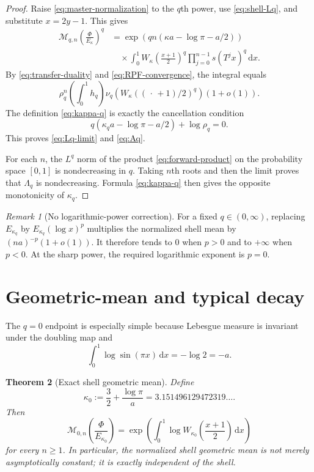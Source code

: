 \documentclass[11pt,oneside]{article}
\newtheorem{theorem}{Theorem}[section]
\theoremstyle{definition}
\theoremstyle{remark}
\newtheorem{remark}[theorem]{Remark}
\newcommand{\dd}{\,\mathrm d}
\newcommand{\Phiup}{\Phi}
\begin{document}
\begin{proof}
Raise \eqref{eq:master-normalization} to the $q$th power, use
\eqref{eq:shell-Lq}, and substitute $x=2y-1$.  This gives
\begin{align*}
 \mathcal M_{q,n}\!\left(\frac{\Phiup}{E_\kappa}\right)^q
 &=\exp\!\left(qn(\kappa a-\log\pi-a/2)\right)\\
 &\quad\times\int_0^1
 W_\kappa\!\left(\frac{x+1}{2}\right)^q
 \prod_{j=0}^{n-1}s(T^jx)^q\dd x.
\end{align*}
By \eqref{eq:transfer-duality} and \eqref{eq:RPF-convergence}, the integral equals
\[
 \rho_q^n\left(\int_0^1h_q\right)
 \nu_q\!\left(W_\kappa((\,\cdot\,+1)/2)^q\right)(1+o(1)).
\]
The definition \eqref{eq:kappa-q} is exactly the cancellation condition
\[
 q(\kappa_q a-\log\pi-a/2)+\log\rho_q=0.
\]
This proves \eqref{eq:Lq-limit} and \eqref{eq:Aq}.

For each $n$, the $L^q$ norm of the product \eqref{eq:forward-product} on the probability
space $[0,1]$ is nondecreasing in $q$.  Taking $n$th roots and then the limit proves that
$\Lambda_q$ is nondecreasing.  Formula \eqref{eq:kappa-q} then gives the opposite
monotonicity of $\kappa_q$.
\end{proof}

\begin{remark}[No logarithmic-power correction]
\label{rem:no-log-correction}
For a fixed $q\in(0,\infty)$, replacing $E_{\kappa_q}$ by
$E_{\kappa_q}(\log x)^p$ multiplies the normalized shell mean by
$(na)^{-p}(1+o(1))$.  It therefore tends to $0$ when $p>0$ and to $+\infty$ when $p<0$.
At the sharp power, the required logarithmic exponent is $p=0$.
\end{remark}

\section{Geometric-mean and typical decay}
\label{sec:typical}

The $q=0$ endpoint is especially simple because Lebesgue measure is invariant under the
doubling map and
\begin{equation}
 \int_0^1\log\sin(\pi x)\dd x=-\log2=-a.
 \label{eq:log-sine-integral}
\end{equation}

\begin{theorem}[Exact shell geometric mean]
\label{thm:geometric-mean}
Define
\begin{equation}
 \kappa_0:=\frac32+\frac{\log\pi}{a}
 =3.151496129472319\ldots .
 \label{eq:kappa0}
\end{equation}
Then
\begin{equation}
 \mathcal M_{0,n}\!\left(\frac{\Phiup}{E_{\kappa_0}}\right)
 =\exp\!\left(\int_0^1
    \log W_{\kappa_0}\!\left(\frac{x+1}{2}\right)\dd x\right)
 \label{eq:exact-geometric-mean}
\end{equation}
for every $n\ge1$.  In particular, the normalized shell geometric mean is not merely
asymptotically constant; it is exactly independent of the shell.
\end{theorem}
\end{document}
